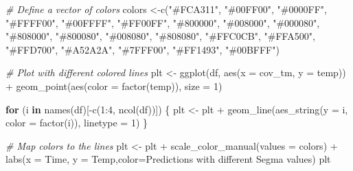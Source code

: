 \documentclass[
]{article}
\newenvironment{Shaded}{\begin{snugshade}}{\end{snugshade}}
\newcommand{\AttributeTok}[1]{\textcolor[rgb]{0.77,0.63,0.00}{#1}}
\newcommand{\CommentTok}[1]{\textcolor[rgb]{0.56,0.35,0.01}{\textit{#1}}}
\newcommand{\ControlFlowTok}[1]{\textcolor[rgb]{0.13,0.29,0.53}{\textbf{#1}}}
\newcommand{\DecValTok}[1]{\textcolor[rgb]{0.00,0.00,0.81}{#1}}
\newcommand{\FunctionTok}[1]{\textcolor[rgb]{0.00,0.00,0.00}{#1}}
\newcommand{\NormalTok}[1]{#1}
\newcommand{\OtherTok}[1]{\textcolor[rgb]{0.56,0.35,0.01}{#1}}
\newcommand{\SpecialCharTok}[1]{\textcolor[rgb]{0.00,0.00,0.00}{#1}}
\newcommand{\StringTok}[1]{\textcolor[rgb]{0.31,0.60,0.02}{#1}}
\begin{document}
\begin{Shaded}
\begin{Highlighting}[]
\CommentTok{\# Define a vector of colors}
\NormalTok{colors }\OtherTok{\textless{}{-}}\FunctionTok{c}\NormalTok{(}\StringTok{"\#FCA311"}\NormalTok{, }\StringTok{"\#00FF00"}\NormalTok{, }\StringTok{"\#0000FF"}\NormalTok{, }\StringTok{"\#FFFF00"}\NormalTok{, }\StringTok{"\#00FFFF"}\NormalTok{,}
            \StringTok{"\#FF00FF"}\NormalTok{, }\StringTok{"\#800000"}\NormalTok{, }\StringTok{"\#008000"}\NormalTok{, }\StringTok{"\#000080"}\NormalTok{, }\StringTok{"\#808000"}\NormalTok{,}
            \StringTok{"\#800080"}\NormalTok{, }\StringTok{"\#008080"}\NormalTok{, }\StringTok{"\#808080"}\NormalTok{, }\StringTok{"\#FFC0CB"}\NormalTok{, }\StringTok{"\#FFA500"}\NormalTok{,}
            \StringTok{"\#FFD700"}\NormalTok{, }\StringTok{"\#A52A2A"}\NormalTok{, }\StringTok{"\#7FFF00"}\NormalTok{, }\StringTok{"\#FF1493"}\NormalTok{, }\StringTok{"\#00BFFF"}\NormalTok{)}

\CommentTok{\# Plot with different colored lines}
\NormalTok{plt }\OtherTok{\textless{}{-}} \FunctionTok{ggplot}\NormalTok{(df, }\FunctionTok{aes}\NormalTok{(}\AttributeTok{x =}\NormalTok{ cov\_tm, }\AttributeTok{y =}\NormalTok{ temp)) }\SpecialCharTok{+}
  \FunctionTok{geom\_point}\NormalTok{(}\FunctionTok{aes}\NormalTok{(}\AttributeTok{color =} \FunctionTok{factor}\NormalTok{(}\StringTok{\textquotesingle{}temp\textquotesingle{}}\NormalTok{)), }\AttributeTok{size =} \DecValTok{1}\NormalTok{)}

\ControlFlowTok{for}\NormalTok{ (i }\ControlFlowTok{in} \FunctionTok{names}\NormalTok{(df)[}\SpecialCharTok{{-}}\FunctionTok{c}\NormalTok{(}\DecValTok{1}\SpecialCharTok{:}\DecValTok{4}\NormalTok{, }\FunctionTok{ncol}\NormalTok{(df))]) \{}
\NormalTok{  plt }\OtherTok{\textless{}{-}}\NormalTok{ plt }\SpecialCharTok{+} \FunctionTok{geom\_line}\NormalTok{(}\FunctionTok{aes\_string}\NormalTok{(}\AttributeTok{y =}\NormalTok{ i, }\AttributeTok{color =} \FunctionTok{factor}\NormalTok{(i)), }\AttributeTok{linetype =} \DecValTok{1}\NormalTok{)}
\NormalTok{\}}

\CommentTok{\# Map colors to the lines}
\NormalTok{plt }\OtherTok{\textless{}{-}}\NormalTok{ plt }\SpecialCharTok{+}
  \FunctionTok{scale\_color\_manual}\NormalTok{(}\AttributeTok{values =}\NormalTok{ colors) }\SpecialCharTok{+}
  \FunctionTok{labs}\NormalTok{(}\AttributeTok{x =} \StringTok{\textquotesingle{}Time\textquotesingle{}}\NormalTok{, }\AttributeTok{y =} \StringTok{\textquotesingle{}Temp\textquotesingle{}}\NormalTok{,}\AttributeTok{color=}\StringTok{\textquotesingle{}Predictions with different Segma values\textquotesingle{}}\NormalTok{)}
\NormalTok{plt}
\end{Highlighting}
\end{Shaded}
\end{document}
